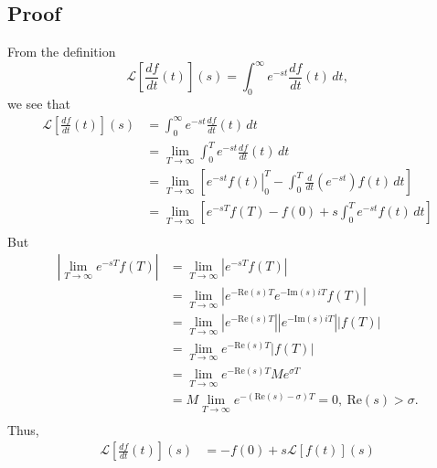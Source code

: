 \documentclass[11pt]{article}
\newcommand{\Laplace}{\mathscr{L}}
\begin{document}
\subsection{Proof}
From the definition
\[ \Laplace \left[ \frac{df}{dt}(t) \right](s) = \int_0^\infty e^{-st} \frac{df}{dt}(t) \, dt, \]
we see that
\begin{align*}
\Laplace \left[ \frac{df}{dt}(t) \right](s) &= \int_0^\infty e^{-st} \frac{df}{dt}(t) \, dt \\
&= \lim_{T \rightarrow \infty} \int_0^T e^{-st} \frac{df}{dt}(t) \, dt \\
&= \lim_{T \rightarrow \infty} \left[ \left. e^{-st}f(t) \right|_0^T - \int_0^T \frac{d}{dt} \left( e^{-st} \right) f(t) \, dt \right] \\
&= \lim_{T \rightarrow \infty} \left[ e^{-sT}f(T) - f(0) + s\int_0^T e^{-st} f(t) \, dt \right] \\
\end{align*}
But
\begin{align*}
\left| \lim_{T \rightarrow \infty} e^{-sT}f(T) \right| &= \lim_{T \rightarrow \infty} \left|  e^{-sT}f(T) \right| \\
&= \lim_{T \rightarrow \infty} \left| e^{-\text{Re}(s)T} e^{-\text{Im}(s)iT} f(T) \right| \\
&= \lim_{T \rightarrow \infty} \left| e^{-\text{Re}(s)T} \right| \left| e^{-\text{Im}(s)iT} \right| \left| f(T) \right| \\
&= \lim_{T \rightarrow \infty} e^{-\text{Re}(s)T} \left| f(T) \right| \\
&= \lim_{T \rightarrow \infty} e^{-\text{Re}(s)T} Me^{\sigma T} \\
&= M \lim_{T \rightarrow \infty} e^{-(\text{Re}(s) - \sigma)T} = 0,\ \text{Re}(s) > \sigma. \\
\end{align*}
Thus,
\begin{align*}
\Laplace \left[ \frac{df}{dt}(t) \right](s) &= -f(0) + s\Laplace[f(t)](s)
\end{align*}
\end{document}
